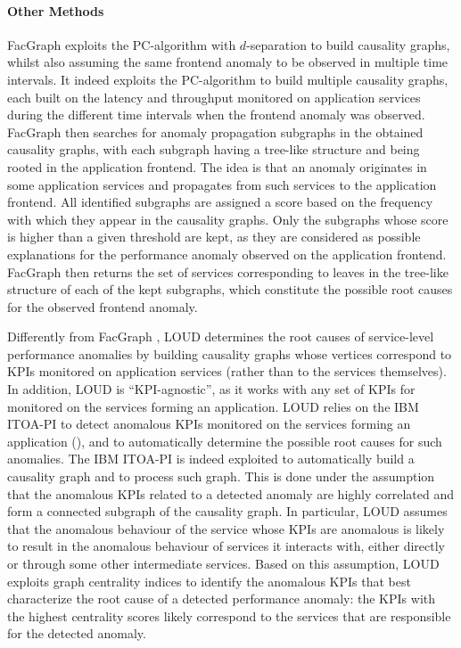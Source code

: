 \paragraph{{Other Methods}}
FacGraph \cite{44_Lin2018_FacGraph} exploits the PC-algorithm \cite{Spirtes2000_CausationPredictionSearchPCAlgoritm} with $d$-separation \cite{Cohen2005_DSeparation} to build causality graphs, whilst also assuming the same frontend anomaly to be observed in multiple time intervals.
It indeed exploits the PC-algorithm to build multiple causality graphs, each built on the latency and throughput monitored on application services during the different time intervals when the frontend anomaly was observed. 
FacGraph \cite{44_Lin2018_FacGraph} then searches for anomaly propagation subgraphs in the obtained causality graphs, with each subgraph having a tree-like structure and being rooted in the application frontend. 
The idea is that an anomaly originates in some application services and propagates from such services to the application frontend. 
All identified subgraphs are assigned a score based on the frequency with which they appear in the causality graphs. 
Only the subgraphs whose score is higher than a given threshold are kept, as they are considered as possible explanations for the performance anomaly observed on the application frontend.
FacGraph \cite{44_Lin2018_FacGraph} then returns the set of services corresponding to leaves in the tree-like structure of each of the kept subgraphs, which constitute the possible root causes for the observed frontend anomaly.

{%
Differently from FacGraph \cite{44_Lin2018_FacGraph}, LOUD \cite{13_Mariani2018_LocalizingFaultsCloudSystems} determines the root causes of service-level performance anomalies by building causality graphs whose vertices correspond to KPIs monitored on application services (rather than to the services themselves).
In addition, LOUD \cite{13_Mariani2018_LocalizingFaultsCloudSystems} is \enquote{KPI-agnostic}, as it works with any set of KPIs for monitored on the services forming an application.
LOUD \cite{13_Mariani2018_LocalizingFaultsCloudSystems} relies on the IBM ITOA-PI \cite{IBM_ITOA_PI} to detect anomalous KPIs monitored on the services forming an application (), and to automatically determine the possible root causes for such anomalies.
The IBM ITOA-PI \cite{IBM_ITOA_PI} is indeed exploited to automatically build a causality graph and to process such graph.
This is done under the assumption that the anomalous KPIs related to a detected anomaly are highly correlated and form a connected subgraph of the causality graph.
In particular, LOUD assumes that the anomalous behaviour of the service whose KPIs are anomalous is likely to result in the anomalous behaviour of services it interacts with, either directly or through some other intermediate services.
Based on this assumption, LOUD exploits graph centrality indices to identify the anomalous KPIs that best characterize the root cause of a detected performance anomaly: the KPIs with the highest centrality scores likely correspond to the services that are responsible for the detected anomaly.
}

